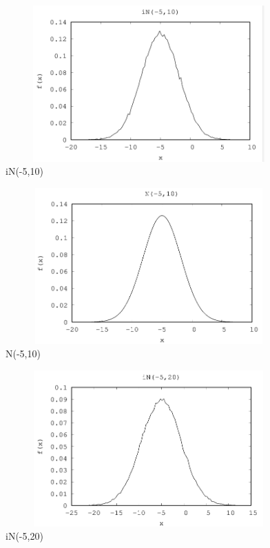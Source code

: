\documentclass[]{article}
\begin{document}
\begin{figure}
	\centering
	\includegraphics[height=6cm,width=11cm]{images/iN-510.png}
	\caption{iN(-5,10)}
	\label{fig9}
\end{figure}

\begin{figure}
	\centering
	\includegraphics[height=6cm,width=11cm]{images/N-510.png}
	\caption{N(-5,10)}
	\label{fig10}
\end{figure}

\begin{figure}
	\centering
	\includegraphics[height=6cm,width=11cm]{images/iN-520.png}
	\caption{iN(-5,20)}
	\label{fig11}
\end{figure}
\end{document}
